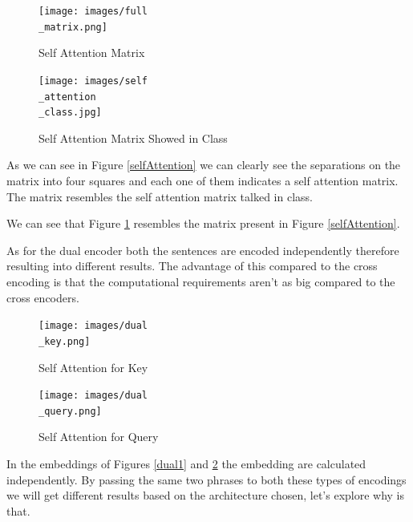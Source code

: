 \documentclass[runningheads]{llncs}
\begin{document}
\begin{figure}[htbp]
    \centering
    \begin{minipage}{0.50\textwidth}
        \centering
        \texttt{[image: images/full\\\_matrix.png]}
        \caption{Self Attention Matrix}
        \label{selfAttention}
    \end{minipage}\hfill
    \begin{minipage}{0.4\textwidth}
        \centering
        \texttt{[image: images/self\\\_attention\\\_class.jpg]}
        \caption{Self Attention Matrix Showed in Class}
         \label{selfAttentionClass}
    \end{minipage}
\end{figure}

As we can see in Figure \ref{selfAttention} we can clearly see the separations on the matrix into four squares and each one of them indicates a self attention matrix. The matrix resembles the self attention matrix talked in class.

We can see that Figure \ref{selfAttentionClass} resembles the matrix present in Figure \ref{selfAttention}.

 As for the dual encoder both the sentences are encoded independently therefore resulting into different results. The advantage of this compared to the cross encoding is that the computational requirements aren't as big compared to the cross encoders. 

\begin{figure}[htbp]
    \centering
    \begin{minipage}{0.50\textwidth}
        \centering
        \texttt{[image: images/dual\\\_key.png]}
        \caption{Self Attention for Key}
         \label{dual1}
    \end{minipage}\hfill
    \begin{minipage}{0.50\textwidth}
        \centering
        \texttt{[image: images/dual\\\_query.png]}
        \caption{Self Attention for Query}
         \label{dual2}
    \end{minipage}
\end{figure}

In the embeddings of Figures \ref{dual1} and \ref{dual2} the embedding are calculated independently.
By passing the same two phrases to both these types of encodings we will get different results based on the architecture chosen, let's explore why is that.\\[5pt]
\end{document}
